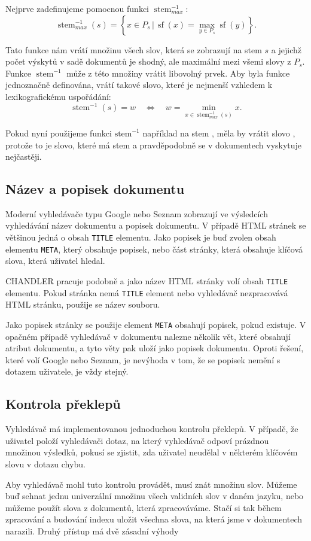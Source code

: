 \documentclass[12pt]{article}
\newcommand{\name}{CHANDLER}
\newcommand{\code}[1]{\texttt{#1}}
\newcommand{\sep}{\,|\,}
\newcommand{\ssection}[1]{\subsection{#1}}
\newcommand{\adds}[1]{\left\{#1\right\}}
\newcommand{\eq}{\Leftrightarrow}
\DeclareMathOperator{\stem}{stem}
\DeclareMathOperator{\wcount}{sf}
\newcommand{\invstem}{\stem^{-1}}
\begin{document}
Nejprve zadefinujeme pomocnou funkci $\invstem_{max}$:
$$\invstem_{max}(s)=\adds{x\in P_s \sep \wcount(x) = \max_{y\in P_s}\wcount(y)}.$$

Tato funkce nám vrátí množinu všech slov, která se zobrazují na stem $s$ a jejichž počet výskytů v sadě dokumentů je shodný, ale maximální mezi všemi slovy z $P_s$. Funkce $\invstem$ může z této množiny vrátit libovolný prvek. Aby byla funkce jednoznačně definována, vrátí takové slovo, které je nejmenší vzhledem k lexikografickému uspořádání:
$$\invstem(s)=w\quad\eq\quad w=\min_{x\in \invstem_{max}(s)}x.$$

Pokud nyní použijeme funkci $\mbox{stem}^{-1}$ například na stem , měla by vrátit slovo , protože to je slovo, které má stem  a pravděpodobně se v dokumentech vyskytuje nejčastěji. 

\ssection{Název a popisek dokumentu}
Moderní vyhledávače typu Google nebo Seznam zobrazují ve výsledcích vyhledávání název dokumentu a popisek dokumentu. V případě HTML stránek se většinou jedná o obsah \code{TITLE} elementu. Jako popisek je buď zvolen obsah elementu \code{META}, který obsahuje popisek, nebo část stránky, která obsahuje klíčová slova, která uživatel hledal. 

\name{} pracuje podobně a jako název HTML stránky volí obsah \code{TITLE} elementu. Pokud stránka nemá \code{TITLE} element nebo vyhledávač nezpracovává HTML stránku, použije se název souboru. 

Jako popisek stránky se použije element \code{META} obsahují popisek, pokud existuje. V opačném případě vyhledávač v dokumentu nalezne několik vět, které obsahují atribut dokumentu, a tyto věty pak uloží jako popisek dokumentu. Oproti řešení, které volí Google nebo Seznam, je nevýhoda v tom, že se popisek nemění s dotazem uživatele, je vždy stejný. 

\ssection{Kontrola překlepů}
Vyhledávač má implementovanou jednoduchou kontrolu překlepů. V případě, že uživatel položí vyhledávači dotaz, na který vyhledávač odpoví prázdnou množinou výsledků, pokusí se zjistit, zda uživatel neudělal v některém klíčovém slovu v dotazu chybu. 

Aby vyhledávač mohl tuto kontrolu provádět, musí znát množinu  slov. Můžeme buď sehnat jednu univerzální množinu všech validních slov v daném jazyku, nebo můžeme použít slova z dokumentů, která zpracováváme. Stačí si tak během zpracování a budování indexu uložit všechna slova, na která jsme v dokumentech narazili. Druhý přístup má dvě zásadní výhody
\end{document}

